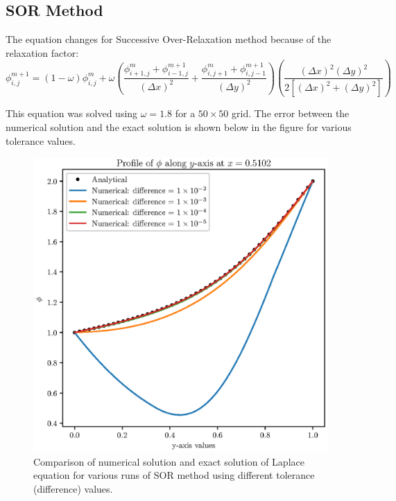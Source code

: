 \documentclass[12pt,a4paper,fleqn]{article}
\begin{document}
\subsection*{SOR Method}
The equation changes for Successive Over-Relaxation method because of the
relaxation factor:
\begin{equation}
\phi^{m+1}_{i,j} = (1-\omega)\phi^m_{i,j} + \omega
\left(
\frac{\phi^m_{i+1,j}+\phi^{m+1}_{i-1,j}}{(\Delta x)^2} +
\frac{\phi^m_{i,j+1}+\phi^{m+1}_{i,j-1}}{(\Delta y)^2}
\right)\left(\frac{(\Delta x)^2(\Delta y)^2}{2[(\Delta x)^2+(\Delta y)^2]}
\right)
\end{equation}

This equation was solved using $\omega = 1.8$ for a $50\times50$ grid. The error
between the numerical solution and the exact solution is shown below in the
figure for various tolerance values.

\begin{figure}[p!]
\centering
\includegraphics[width=\linewidth]{sorError.eps}
\caption{Comparison of numerical solution and exact solution of Laplace
equation for various runs of SOR method using different tolerance
(difference) values.}
\end{figure}
\end{document}
